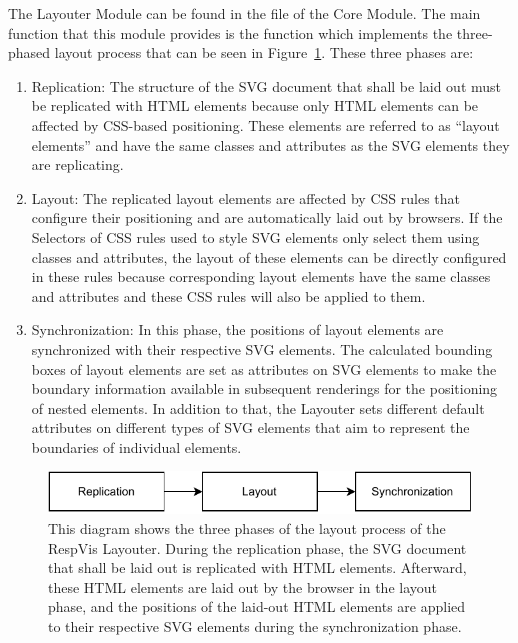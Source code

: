 The Layouter Module can be found in the  file of the Core Module.
The main function that this module provides is the  function which implements the three-phased layout process that can be seen in Figure~\ref{fig:LayoutProcess}.
These three phases are:
\begin{enumerate}
\item Replication:
The structure of the SVG document that shall be laid out must be replicated with HTML  elements because only HTML elements can be affected by CSS-based positioning.
These elements are referred to as \enquote{layout elements} and have the same classes and  attributes as the SVG elements they are replicating.

\item Layout:
The replicated layout elements are affected by CSS rules that configure their positioning and are automatically laid out by browsers. 
If the Selectors of CSS rules used to style SVG elements only select them using classes and  attributes, the layout of these elements can be directly configured in these rules because corresponding layout elements have the same classes and  attributes and these CSS rules will also be applied to them.

\item Synchronization:
In this phase, the positions of layout elements are synchronized with their respective SVG elements.
The calculated bounding boxes of layout elements are set as  attributes on SVG elements to make the boundary information available in subsequent renderings for the positioning of nested elements.
In addition to that, the Layouter sets different default attributes on different types of SVG elements that aim to represent the boundaries of individual elements.
\end{enumerate}

\begin{figure}[tp]
\centering
\includegraphics[keepaspectratio,width=\linewidth,height=\fullh]{diagrams/respvis-layout-process.pdf}
\caption[Layout Process of the Layouter]{
  This diagram shows the three phases of the layout process of the RespVis Layouter. 
  During the replication phase, the SVG document that shall be laid out is replicated with HTML  elements. 
  Afterward, these HTML elements are laid out by the browser in the layout phase, and the positions of the laid-out HTML elements are applied to their respective SVG elements during the synchronization phase.
}
\label{fig:LayoutProcess}
\end{figure}


